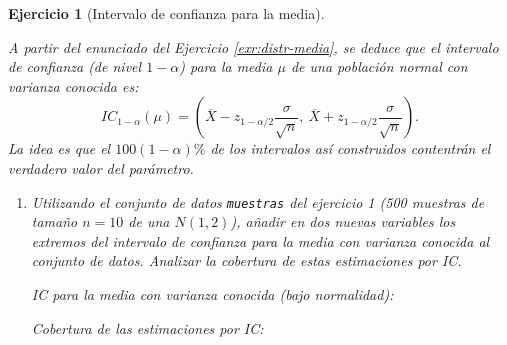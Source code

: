 \documentclass[
]{book}
\newenvironment{Shaded}{\begin{snugshade}}{\end{snugshade}}
\newcommand{\CommentTok}[1]{\textcolor[rgb]{0.56,0.35,0.01}{\textit{#1}}}
\newcommand{\DecValTok}[1]{\textcolor[rgb]{0.00,0.00,0.81}{#1}}
\newcommand{\FloatTok}[1]{\textcolor[rgb]{0.00,0.00,0.81}{#1}}
\newcommand{\FunctionTok}[1]{\textcolor[rgb]{0.00,0.00,0.00}{#1}}
\newcommand{\NormalTok}[1]{#1}
\newcommand{\OtherTok}[1]{\textcolor[rgb]{0.56,0.35,0.01}{#1}}
\newcommand{\SpecialCharTok}[1]{\textcolor[rgb]{0.00,0.00,0.00}{#1}}
\theoremstyle{break}
\newtheorem{exercise}{Ejercicio}[chapter]
\theoremstyle{nonumberplain}
\renewcommand{\CommentTok}[1]{\textcolor[rgb]{0.41,0.41,0.41}{\texttt{#1}}}
\begin{document}
\begin{exercise}[Intervalo de confianza para la media]
\protect\hypertarget{exr:ic-media}{}\label{exr:ic-media}

A partir del enunciado del Ejercicio \ref{exr:distr-media}, se deduce que el intervalo de confianza (de nivel \(1-\alpha\)) para la media \(\mu\) de una población normal con varianza conocida es:
\[IC_{1-\alpha}\left(  \mu\right)  = 
\left(  \overline{X}-z_{1-\alpha/2}\dfrac{\sigma}{\sqrt{n}},\ \overline{X} 
+ z_{1-\alpha/2}\dfrac{\sigma}{\sqrt{n}} \right).\]
La idea es que el \(100(1-\alpha)\%\) de los intervalos así construidos contentrán el verdadero valor del parámetro.

\begin{enumerate}
\def\labelenumi{\alph{enumi})}
\item
  Utilizando el conjunto de datos \texttt{muestras} del ejercicio 1 (500
  muestras de tamaño \(n=10\) de una \(N(1,2)\)), añadir en dos nuevas
  variables los extremos del intervalo de confianza para la media
  con varianza conocida al conjunto de datos. Analizar la
  cobertura de estas estimaciones por IC.

  IC para la media con varianza conocida (bajo normalidad):

\begin{Shaded}
\end{Shaded}

  Cobertura de las estimaciones por IC:

\begin{Shaded}
\end{Shaded}


\end{enumerate}
\end{exercise}
\end{document}
